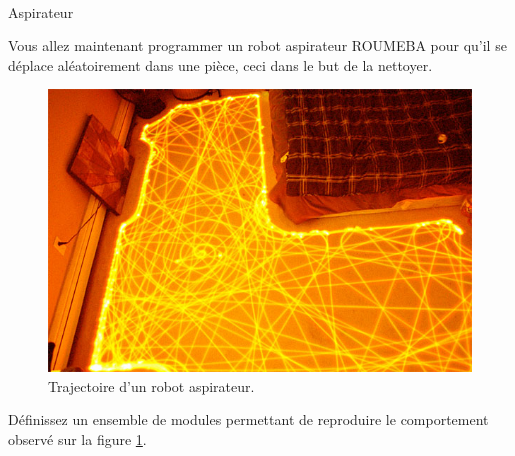\documentclass[11pt]{exam}
\begin{document}
~\\

{\Large Aspirateur} 

Vous allez maintenant programmer un robot aspirateur ROUMEBA pour qu'il se déplace aléatoirement dans une pièce, ceci dans le but de la nettoyer. 

\begin{figure}
\includegraphics[width=\linewidth]{./roomba-movements.jpg}
\caption{\label{fig:roomba} Trajectoire d'un robot aspirateur.}
\end{figure}

\begin{questions}
\begin{quest}
Définissez un ensemble de modules permettant de reproduire le comportement observé sur la figure \ref{fig:roomba}.
\end{quest}\end{questions}
\end{document}
